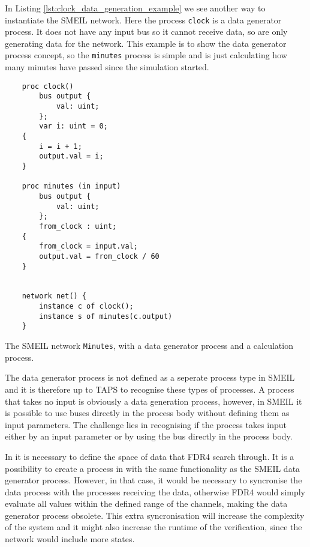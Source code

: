 In Listing \ref{lst:clock_data_generation_example} we see another way to instantiate the SMEIL network. Here the process \texttt{clock} is a data generator process. It does not have any input bus so it cannot receive data, so are only generating data for the network. This example is to show the data generator process concept, so the \texttt{minutes} process is simple and is just calculating how many minutes have passed since the simulation started.
\begin{listing}
    \begin{verbatim}
    proc clock()
        bus output {
            val: uint;
        };
        var i: uint = 0;
    {
        i = i + 1;
        output.val = i;
    }

    proc minutes (in input)
        bus output {
            val: uint;
        };
        from_clock : uint;
    {
        from_clock = input.val;
        output.val = from_clock / 60
    }


    network net() {
        instance c of clock();
        instance s of minutes(c.output)
    }
    \end{verbatim}
    \caption{The SMEIL network \texttt{Minutes}, with a data generator process and a calculation process.}
    \label{lst:clock_data_generation_example}
\end{listing}

The data generator process is not defined as a seperate process type in SMEIL and it is therefore up to TAPS to recognise these types of processes. A process that takes no input is obviously a data generation process, however, in SMEIL it is possible to use buses directly in the process body without defining them as input parameters. The challenge lies in recognising if the process takes input either by an input parameter or by using the bus directly in the process body.

In \cspm it is necessary to define the space of data that FDR4 search through. It is a possibility to create a process in \cspm with the same functionality as the SMEIL data generator process. However, in that case, it would be necessary to syncronise the data process with the processes receiving the data, otherwise FDR4 would simply evaluate all values within the defined range of the channels, making the data generator process obsolete. This extra syncronisation will increase the complexity of the system and it might also increase the runtime of the verification, since the \cspm{} network would include more states.

